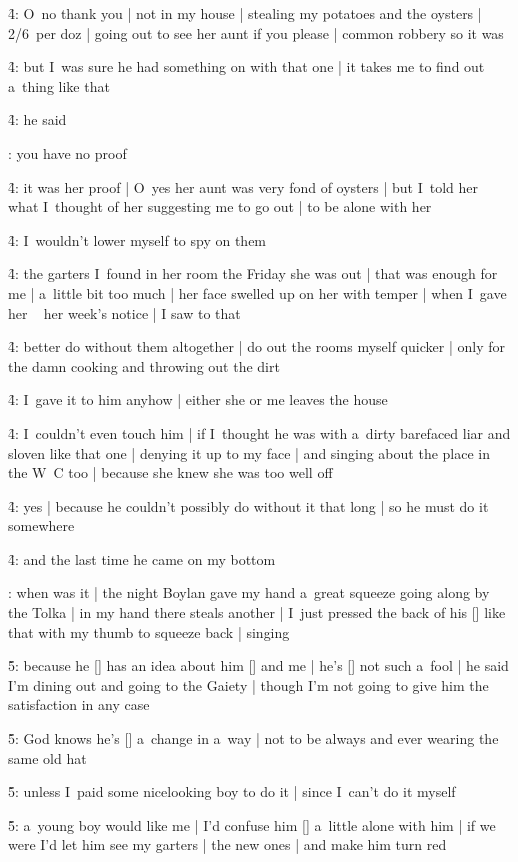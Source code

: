 \f4:
O~no thank you |
not in my house |
stealing my potatoes and the oysters |
2/6~per doz |
going out to see her aunt if you please |
common robbery so it was

\f4:
but I~was sure he had something on with that one |
it takes me to find out a~thing like that

\f4:
he said

:
you have no proof

\f4:
it was her proof |
O~yes her aunt was very fond of oysters |
but I~told her what I~thought of her suggesting me to go out |
to be alone with her

\f4:
I~wouldn't lower myself to spy on them

\f4:
the garters I~found in her room the Friday she was out |
that was enough for me |
a~little bit too much |
her face swelled up on her with temper |
when I~gave her ~ her week's notice |
I saw to that

\f4:
better do without them altogether |
do out the rooms myself quicker |
only for the damn cooking and throwing out the dirt

\f4:
I~gave it to him anyhow |
either she or me leaves the house

\f4:
I~couldn't even touch him |
if I~thought he was with a~dirty barefaced liar and sloven like that one |
denying it up to my face |
and singing about the place in the W~C too |
because she knew she was too well off

\f4:
yes |
because he couldn't possibly do without it that long |
so he must do it somewhere

\f4:
and the last time he came on my bottom

:
when was it |
the night Boylan gave my hand a~great squeeze going along by the Tolka |
in my hand there steals another |
I~just pressed the back of his [\boylan] like that with my thumb to squeeze back |
singing 

\f5:
because he [\bloom] has an idea about him [\boylan] and me |
he's [\bloom] not such a~fool |
he said I'm dining out and going to the Gaiety |
though I'm not going to give him the satisfaction in any case

\f5:
God knows he's [\boylan] a~change in a~way |
not to be always and ever wearing the same old hat

\f5:
unless I~paid some nicelooking boy to do it |
since I~can't do it myself

\f5:
a~young boy would like me |
I'd confuse him [\boy] a~little alone with him |
if we were I'd let him see my garters |
the new ones |
and make him turn red

